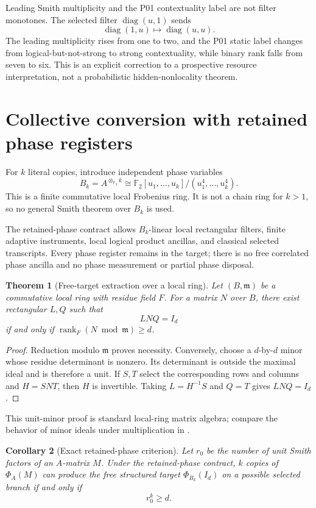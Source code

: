 \documentclass[11pt]{article}
\newtheorem{theorem}{Theorem}[section]
\newtheorem{corollary}[theorem]{Corollary}
\theoremstyle{definition}
\theoremstyle{remark}
\newcommand{\F}{\mathbb F_2}
\newcommand{\rank}{\operatorname{rank}}
\newcommand{\diag}{\operatorname{diag}}
\begin{document}
Leading Smith multiplicity and the P01 contextuality label are not filter monotones. The selected filter $\diag(u,1)$ sends
\[
  \diag(1,u)\longmapsto\diag(u,u).
\]
The leading multiplicity rises from one to two, and the P01 static label changes from logical-but-not-strong to strong contextuality, while binary rank falls from seven to six. This is an explicit correction to a prospective resource interpretation, not a probabilistic hidden-nonlocality theorem.

\section{Collective conversion with retained phase registers}

For $k$ literal copies, introduce independent phase variables
\[
  B_k=A^{\otimes_{\F}k}
  \cong\F[u_1,\ldots,u_k]/(u_1^4,\ldots,u_k^4).
\]
This is a finite commutative local Frobenius ring. It is not a chain ring for $k>1$, so no general Smith theorem over $B_k$ is used.

The retained-phase contract allows $B_k$-linear local rectangular filters, finite adaptive instruments, local logical product ancillas, and classical selected transcripts. Every phase register remains in the target; there is no free correlated phase ancilla and no phase measurement or partial phase disposal.

\begin{theorem}[Free-target extraction over a local ring]\label{thm:unitminor}
Let $(B,\mathfrak m)$ be a commutative local ring with residue field $F$. For a matrix $N$ over $B$, there exist rectangular $L,Q$ such that
\[
  LNQ=I_d
\]
if and only if $\rank_F(N\bmod\mathfrak m)\ge d$.
\end{theorem}

\begin{proof}
Reduction modulo $\mathfrak m$ proves necessity. Conversely, choose a $d$-by-$d$ minor whose residue determinant is nonzero. Its determinant is outside the maximal ideal and is therefore a unit. If $S,T$ select the corresponding rows and columns and $H=SNT$, then $H$ is invertible. Taking $L=H^{-1}S$ and $Q=T$ gives $LNQ=I_d$.
\end{proof}

This unit-minor proof is standard local-ring matrix algebra; compare the behavior of minor ideals under multiplication in \cite{StacksFitting}.

\begin{corollary}[Exact retained-phase criterion]\label{cor:phase}
Let $r_0$ be the number of unit Smith factors of an $A$-matrix $M$. Under the retained-phase contract, $k$ copies of $\Phi_A(M)$ can produce the free structured target $\Phi_{B_k}(I_d)$ on a possible selected branch if and only if
\[
  r_0^k\ge d.
\]
\end{corollary}
\end{document}
